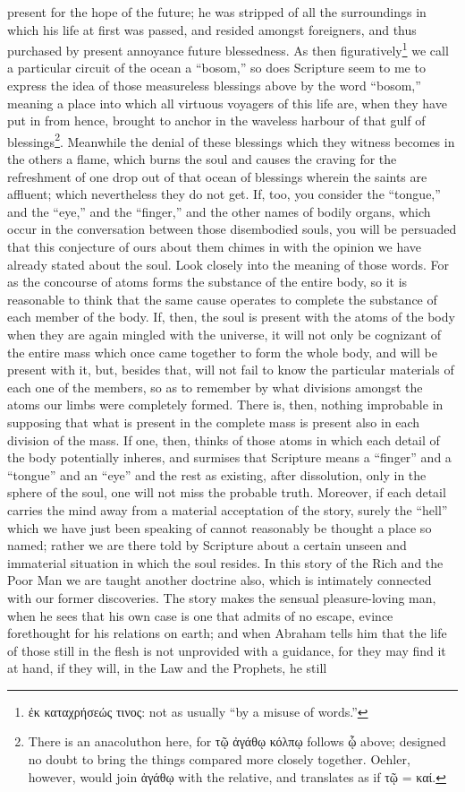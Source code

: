 present for the hope of the future; he was stripped of all the surroundings in which his life at first was passed, and resided amongst foreigners, and thus purchased by present annoyance future blessedness. As then figuratively\footnote{\textgreek{ἐκ καταχρήσεώς τινος}: not as usually “by a misuse of words.”} we call a particular circuit of the ocean a “bosom,” so does Scripture seem to me to express the idea of those measureless blessings above by the word “bosom,” meaning a place into which all virtuous voyagers of this life are, when they have put in from hence, brought to anchor in the waveless harbour of that gulf of blessings\footnote{There is an anacoluthon here, for \textgreek{τῷ ἀγάθῳ κόλπῳ} follows \textgreek{ᾧ} above; designed no doubt to bring the things compared more closely together. Oehler, however, would join \textgreek{ἀγάθῳ} with the relative, and translates as if \textgreek{τῷ = καί}.}. Meanwhile the denial of these blessings which they witness becomes in the others a flame, which burns the soul and causes the craving for the refreshment of one drop out of that ocean of blessings wherein the saints are affluent; which nevertheless they do not get. If, too, you consider the “tongue,” and the “eye,” and the “finger,” and the other names of bodily organs, which occur in the conversation between those disembodied souls, you will be persuaded that this conjecture of ours about them chimes in with the opinion we have already stated about the soul. Look closely into the meaning of those words. For as the concourse of atoms forms the substance of the entire body, so it is reasonable to think that the same cause operates to complete the substance of each member of the body. If, then, the soul is present with the atoms of the body when they are again mingled with the universe, it will not only be cognizant of the entire mass which once came together to form the whole body, and will be present with it, but, besides that, will not fail to know the particular materials of each one of the members, so as to remember by what divisions amongst the atoms our limbs were completely formed. There is, then, nothing improbable in supposing that what is present in the complete mass is present also in each division of the mass. If one, then, thinks of those atoms in which each detail of the body potentially inheres, and surmises that Scripture means a “finger” and a “tongue” and an “eye” and the rest as existing, after dissolution, only in the sphere of the soul, one will not miss the probable truth. Moreover, if each detail carries the mind away from a material acceptation of the story, surely the “hell” which we have just been speaking of cannot reasonably be thought a place so named; rather we are there told by Scripture about a certain unseen and immaterial situation in which the soul resides. In this story of the Rich and the Poor Man we are taught another doctrine also, which is intimately connected with our former discoveries. The story makes the sensual pleasure-loving man, when he sees that his own case is one that admits of no escape, evince forethought for his relations on earth; and when Abraham tells him that the life of those still in the flesh is not unprovided with a guidance, for they may find it at hand, if they will, in the Law and the Prophets, he still 